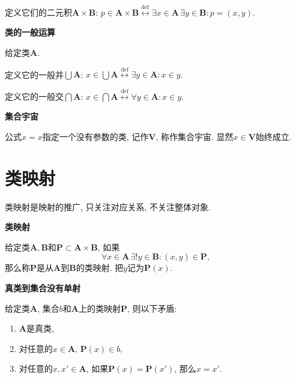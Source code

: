 \documentclass[UTF8]{ctexart}
\begin{document}
定义它们的二元积$\mathbf{A}\times\mathbf{B}$:
$p\in\mathbf{A}\times\mathbf{B}\overset{\mathrm{def}}{\leftrightarrow}
\exists x\in\mathbf{A}\,\exists y\in\mathbf{B}:p=(x,y)$.

\vspace{10pt}

\hypertarget{sec:类的一般运算}{}
\noindent\textbf{类的一般运算}

给定类$\mathbf{A}$.

定义它的一般并$\displaystyle\bigcup\mathbf{A}$:
$\displaystyle x\in\bigcup\mathbf{A}\overset{\mathrm{def}}{\leftrightarrow}
\exists y\in\mathbf{A}:x\in y$.

定义它的一般交$\displaystyle\bigcap\mathbf{A}$:
$\displaystyle x\in\bigcap\mathbf{A}\overset{\mathrm{def}}{\leftrightarrow}
\forall y\in\mathbf{A}:x\in y$.

\vspace{10pt}

\hypertarget{sec:集合宇宙}{}
\noindent\textbf{集合宇宙}

公式$x=x$指定一个没有参数的类, 记作$\mathbf{V}$, 称作集合宇宙.
显然$x\in\mathbf{V}$始终成立.





\newpage

\section*{类映射}

类映射是映射的推广, 只关注对应关系, 不关注整体对象.

\vspace{10pt}

\hypertarget{sec:类映射}{}
\noindent\textbf{类映射}

给定类$\mathbf{A},\mathbf{B}$和$\mathbf{P}\subset\mathbf{A}\times\mathbf{B}$,
如果
\[
    \forall x\in\mathbf{A}\,\exists!y\in\mathbf{B}:(x,y)\in\mathbf{P},
\]
那么称$\mathbf{P}$是从$\mathbf{A}$到$\mathbf{B}$的类映射. 把$y$记为$\mathbf{P}(x)$.

\vspace{10pt}

\hypertarget{sec:真类到集合没有单射}{}
\noindent\textbf{真类到集合没有单射}

给定类$\mathbf{A}$, 集合$b$和$\mathbf{A}$上的类映射$\mathbf{P}$, 则以下矛盾:
\begin{enumerate}
    \item $\mathbf{A}$是真类,
    \item 对任意的$x\in\mathbf{A}$, $\mathbf{P}(x)\in b$,
    \item 对任意的$x,x'\in\mathbf{A}$,
    如果$\mathbf{P}(x)=\mathbf{P}(x')$, 那么$x=x'$.
\end{enumerate}
\end{document}
